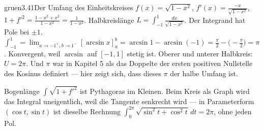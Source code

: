 \begin{loesungkarte}{gruen}{3.41}{Der Umfang des Einheitskreises}
$f(x) = \sqrt{1 - x^{2}}$, $f'(x) = \frac{-x}{\sqrt{1 - x^{2}}}$, $1 + f'^{2} = \frac{1 - x^{2} + x^{2}}{1 - x^{2}} = \frac1{1 - x^{2}}$. Halbkreislänge $L = \int_{-1}^{1}\frac{dx}{\sqrt{1 - x^{2}}}$.
Der Integrand hat Pole bei $\pm1$. $\int_{-1}^{1} = \lim_{a\to-1^{+}, b\to1^{-}}[\arcsin x]_a^{b} = \arcsin1 - \arcsin(-1) = \frac\pi2 - \bigl(-\frac\pi2\bigr) = \pi$. Konvergent, weil $\arcsin$ auf $[-1, 1]$ stetig ist.
Oberer und unterer Halbkreis: $U = 2\pi$. Und $\pi$ war in Kapitel 5 als das Doppelte der ersten positiven Nullstelle des Kosinus definiert --- hier zeigt sich, dass dieses $\pi$ der halbe Umfang ist.
\begin{mitnehmen}\kastentext
Bogenlänge $\int\sqrt{1 + f'^{2}}$ ist Pythagoras im Kleinen. Beim Kreis als Graph wird das Integral uneigentlich, weil die Tangente senkrecht wird --- in Parameterform $(\cos t, \sin t)$ ist dieselbe Rechnung $\int_0^{2\pi}\sqrt{\sin^{2}t + \cos^{2}t}\,dt = 2\pi$, ohne jeden Pol.
\end{mitnehmen}
\end{loesungkarte}

